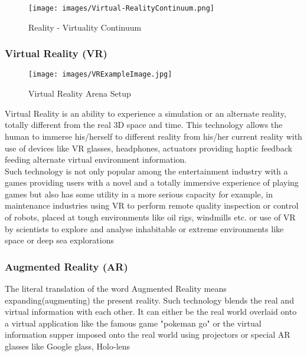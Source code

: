 \documentclass{article}
\begin{document}
\begin{figure}[htp]
    \centering
    \texttt{[image: images/Virtual-RealityContinuum.png]}
    \caption{Reality - Virtuality Continuum}
    
    \author{Jack Liu}
    \label{fig: V-RContinuum}
\end{figure}


\subsubsection{Virtual Reality (VR)}

\begin{figure}[htp]
    \centering
    \texttt{[image: images/VRExampleImage.jpg]}
    \caption{Virtual Reality Arena Setup}
    
    \author{J. M. Eddins Jr/US Air Force}
    \label{fig: vRExample}
\end{figure}

Virtual Reality is an ability to experience a simulation or an alternate reality,  totally different from the real 3D space and time. This technology allows the human to immerse his/herself to different reality from his/her current reality with use of devices like VR glasses, headphones, actuators providing haptic feedback feeding alternate virtual environment information.\\



Such technology is not only popular among the entertainment industry with a games providing users with a novel and a totally immersive experience of playing games but also has some utility in a more serious capacity for example, in maintenance industries using VR to perform remote quality inspection or control of robots, placed at tough environments like oil rigs, windmills etc. or use of VR by scientists to explore and analyse inhabitable or extreme environments like space or deep sea explorations \cite{spaceAR} 

\subsubsection{Augmented Reality (AR)}

The literal translation of the word Augmented Reality means expanding(augmenting) the present reality. Such technology blends the real and virtual information with each other. It can either be the real world overlaid onto a virtual application like the famous game "pokeman go" or the virtual information supper imposed onto the real world using projectors or special AR glasses like Google glass, Holo-lens
\end{document}
